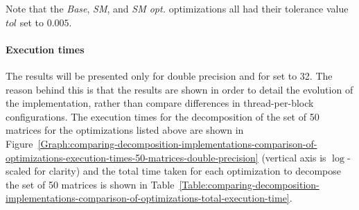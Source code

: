 Note that the \textit{Base}, \textit{SM}, and \textit{SM opt.} optimizations all had their tolerance value $ tol $ set to $ 0.005 $.

\paragraph{Execution times} The results will be presented only for double precision and for  set to 32. The reason behind this is that the results are shown in order to detail the evolution of the implementation, rather than compare differences in thread-per-block configurations. The execution times for the decomposition of the set of 50 matrices for the optimizations listed above are shown in Figure~\ref{Graph:comparing-decomposition-implementations-comparison-of-optimizations-execution-times-50-matrices-double-precision} (vertical axis is $ \log $-scaled for clarity) and the total time taken for each optimization to decompose the set of 50 matrices is shown in Table~\ref{Table:comparing-decomposition-implementations-comparison-of-optimizations-total-execution-time}.

